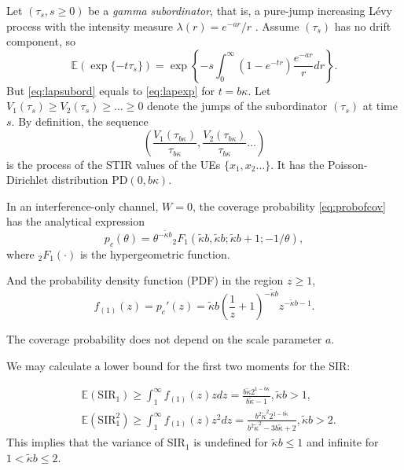 \documentclass[conference]{IEEEtran}
\theoremstyle{definition}
\theoremstyle{plain}
\begin{document}
                    
          Let $(\tau_s, s\geq 0)$ be a \textit{gamma subordinator}, that is, a pure-jump increasing Lévy process with the intensity measure $\lambda(r) = e^{-ar}/r$ . Assume $(\tau_s)$ has no drift component, so
          \begin{equation}
            \label{eq:lapsubord}
            \mathbb{E}(\exp\{-t \tau_s\}) = \exp\left\{-s \int_0^{\infty}(1-e^{-t r})\frac{e^{-ar}}{r} dr \right\}.
          \end{equation}
          But \eqref{eq:lapsubord} equals to \eqref{eq:lapexp} for $t=b \kappa$. Let $V_1(\tau_s) \geq V_2(\tau_s)\geq \dots \geq 0 $ denote the jumps of the subordinator $(\tau_s)$ at time $s$. By definition, the sequence
          \begin{equation}
            \left(\frac{V_1(\tau_{b\kappa})}{\tau_{b\kappa}},\frac{V_2(\tau_{b\kappa})}{\tau_{b\kappa}} \dots \right)
          \end{equation}
          is the process of the STIR values of the UEs $\{x_1,x_2 \dots\}$. It has the Poisson-Dirichlet distribution PD$(0, b \kappa)$.
                    

          In an interference-only channel, $W=0$, the coverage probability \eqref{eq:probofcov} has the analytical expression
          \begin{equation}
p_c(\theta) =  \theta^{-\tilde{\kappa}b} {_2F_1}\left(\tilde{\kappa}b, \tilde{\kappa}b;\tilde{\kappa}b + 1; -1/\theta \right),
          \end{equation}
          where $_2F_1(\cdot)$ is the hypergeometric function. 

          And the probability density function (PDF) in the region $z \geq 1$,
          \begin{equation}
            f_{(1)}(z) = p_c'(z)= \tilde{\kappa} b  \left(\frac{1}{z }+1\right)^{- \tilde{\kappa}b } z^{- \tilde{\kappa}b -1}.
          \end{equation}

          The coverage probability does not depend on the scale parameter $a$.
           
          

          We may calculate a lower bound for the first two moments for the SIR:



          \begin{align}
            &\mathbb{E}(\text{SIR}_1)  \geq\int_{1}^{\infty}f_{(1)}(z)zdz=\frac{b \tilde{\kappa}  2^{1-b \kappa }}{b \tilde{\kappa} -1}, \tilde{\kappa}b >1, \\
            &\mathbb{E}(\text{SIR}^2_1) \geq \int_{1}^{\infty}f_{(1)}(z)z^2dz = \frac{b^2 \tilde{\kappa} ^2 2^{1-b \tilde{\kappa} }}{b^2 \tilde{\kappa} ^2-3 b \tilde{\kappa} +2},\tilde{\kappa}b >2.
          \end{align}
          This implies that the variance of SIR$_1$ is undefined for $\tilde{\kappa}b \leq 1$ and infinite for $1 <\tilde{\kappa}b \leq 2$.
          
\end{document}
